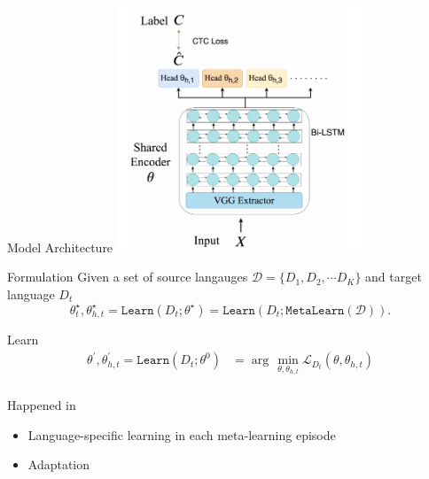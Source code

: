 \documentclass{beamer}
\begin{document}
\begin{frame}[t]{Model Architecture}
  \center \includegraphics[width=0.55\textwidth]{fig/model_arch.png}
\end{frame}

\begin{frame}[t]{Formulation}
  Given a set of source langauges $\mathcal{D} = \{D_1, D_2, \cdots D_K \}$ and target language $D_t$
  \begin{equation*}
    \theta^{\star}_t, \theta^{\star}_{h,t} = \texttt{Learn}(D_t;\theta^{\star}) = \texttt{Learn}(D_t;\texttt{MetaLearn}(\mathcal{D})).
  \end{equation*}

\end{frame}

\begin{frame}[t]{Learn}
\begin{equation*}
  \begin{aligned}
    \theta^\prime, \theta^\prime_{h,t} = \texttt{Learn}(D_t;\theta^0) & = \arg \, \min_{\theta, \theta_{h,t}} \mathcal{L}_{D_t}(\theta, \theta_{h,t}) \\
  \end{aligned}
\end{equation*}
  \vspace{2em}

  Happened in 
  \begin{itemize}
    \item Language-specific learning in each meta-learning episode
    \item Adaptation
  \end{itemize}
\end{frame}
\end{document}
